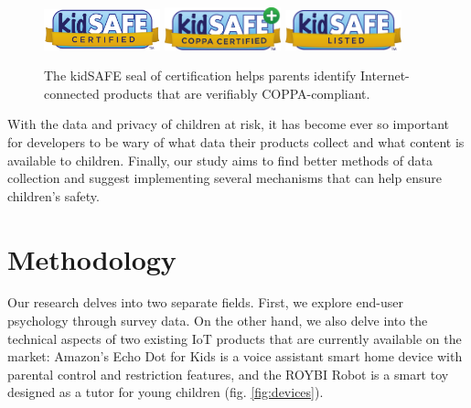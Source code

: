 \documentclass[12pt]{ucthesis}
\begin{document}
\begin{figure}
    \centering
    \includegraphics[width=0.3\textwidth]{kidsafe1.png}
    \includegraphics[width=0.3\textwidth]{kidsafe2.png}
    \includegraphics[width=0.3\textwidth]{kidsafe3.png}
    \caption{The kidSAFE seal of certification helps parents identify Internet-connected products that are verifiably COPPA-compliant.}
    \label{fig:kidsafe}
\end{figure}

With the data and privacy of children at risk, it has become ever so important for developers to be wary of what data their products collect and what content is available to children. Finally, our study aims to find better methods of data collection and suggest implementing several mechanisms that can help ensure children's safety. 

\chapter{Methodology}
\label{ch:methodology}
Our research delves into two separate fields. First, we explore end-user psychology through survey data. On the other hand, we also delve into the technical aspects of two existing IoT products that are currently available on the market: Amazon's Echo Dot for Kids is a voice assistant smart home device with parental control and restriction features, and the ROYBI Robot is a smart toy designed as a tutor for young children (fig. \ref{fig:devices}).
\end{document}
